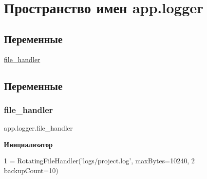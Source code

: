 \hypertarget{namespaceapp_1_1logger}{}\section{Пространство имен app.\+logger}
\label{namespaceapp_1_1logger}
\subsection*{Переменные}
\begin{DoxyCompactItemize}
\item 
\mbox{\hyperlink{namespaceapp_1_1logger_ad08dccf52a81966328998e474ec1b933}{file\+\_\+handler}}
\end{DoxyCompactItemize}


\subsection{Переменные}
\mbox{\label{namespaceapp_1_1logger_ad08dccf52a81966328998e474ec1b933}} 
\subsubsection{\texorpdfstring{file\+\_\+handler}{file\_handler}}
{\footnotesize\ttfamily app.\+logger.\+file\+\_\+handler}

{\bfseries Инициализатор}
\begin{DoxyCode}
1 =  RotatingFileHandler(\textcolor{stringliteral}{'logs/project.log'}, maxBytes=10240,
2                                        backupCount=10)
\end{DoxyCode}
